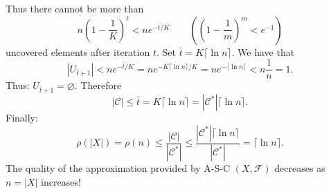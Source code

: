 Thus there cannot be more than
\[n\left(1-\frac1K\right)^t<ne^{-t/K}\qquad
\left(\left(1-\frac1m\right)^m<e^{-1}\right)\]
uncovered elements after iteration $t$.
Set $\bar t=K\lceil\ln n\rceil$. We have that
\[|U_{\bar t+1}|<ne^{-\bar t/K}
=ne^{-K\lceil\ln n\rceil/K}
=ne^{-\lceil\ln n\rceil}<n\frac1n=1.\]
Thus: $U_{\bar t+1}=\varnothing$. Therefore
\[|\mathcal C|\leq\bar t=K\lceil\ln n\rceil
=|\mathcal C^*|\lceil\ln n\rceil.\]
Finally:
\[\rho(|X|)=\rho(n)\leq\frac{|\mathcal C|}{|\mathcal C^*|}
\leq\frac{|\mathcal C^*|\lceil\ln n\rceil}{|\mathcal C^*|}
=\lceil\ln n\rceil.\]
The quality of the approximation provided by A-S-C $(X,\mathcal F)$ decreases as $n=|X|$ increases!
